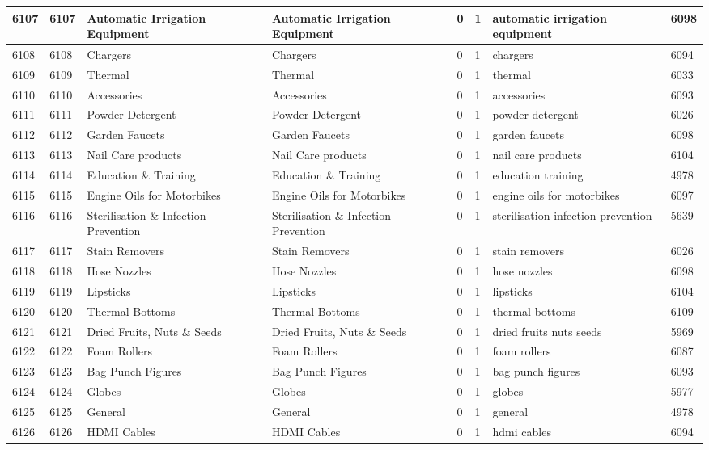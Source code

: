 \begin{longtable}{|l|l|l|l|l|l|l|l|}
6107 & 6107 & Automatic Irrigation Equipment & Automatic Irrigation Equipment & 0 & 1 & automatic irrigation equipment & 6098 \\ \hline 
6108 & 6108 & Chargers & Chargers & 0 & 1 & chargers & 6094 \\ \hline 
6109 & 6109 & Thermal & Thermal & 0 & 1 & thermal & 6033 \\ \hline 
6110 & 6110 & Accessories & Accessories & 0 & 1 & accessories & 6093 \\ \hline 
6111 & 6111 & Powder Detergent & Powder Detergent & 0 & 1 & powder detergent & 6026 \\ \hline 
6112 & 6112 & Garden Faucets & Garden Faucets & 0 & 1 & garden faucets & 6098 \\ \hline 
6113 & 6113 & Nail Care products & Nail Care products & 0 & 1 & nail care products & 6104 \\ \hline 
6114 & 6114 & Education \& Training & Education \& Training & 0 & 1 & education training & 4978 \\ \hline 
6115 & 6115 & Engine Oils for Motorbikes & Engine Oils for Motorbikes & 0 & 1 & engine oils for motorbikes & 6097 \\ \hline 
6116 & 6116 & Sterilisation \& Infection Prevention & Sterilisation \& Infection Prevention & 0 & 1 & sterilisation infection prevention & 5639 \\ \hline 
6117 & 6117 & Stain Removers & Stain Removers & 0 & 1 & stain removers & 6026 \\ \hline 
6118 & 6118 & Hose Nozzles & Hose Nozzles & 0 & 1 & hose nozzles & 6098 \\ \hline 
6119 & 6119 & Lipsticks & Lipsticks & 0 & 1 & lipsticks & 6104 \\ \hline 
6120 & 6120 & Thermal Bottoms & Thermal Bottoms & 0 & 1 & thermal bottoms & 6109 \\ \hline 
6121 & 6121 & Dried Fruits, Nuts \& Seeds & Dried Fruits, Nuts \& Seeds & 0 & 1 & dried fruits nuts seeds & 5969 \\ \hline 
6122 & 6122 & Foam Rollers & Foam Rollers & 0 & 1 & foam rollers & 6087 \\ \hline 
6123 & 6123 & Bag Punch Figures & Bag Punch Figures & 0 & 1 & bag punch figures & 6093 \\ \hline 
6124 & 6124 & Globes & Globes & 0 & 1 & globes & 5977 \\ \hline 
6125 & 6125 & General & General & 0 & 1 & general & 4978 \\ \hline 
6126 & 6126 & HDMI Cables & HDMI Cables & 0 & 1 & hdmi cables & 6094 \\ \hline 

\end{longtable}

